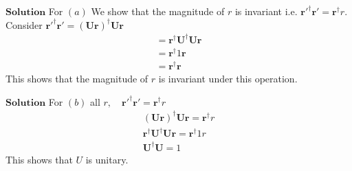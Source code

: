 \documentclass{article}
\begin{document}
\begin{flushleft}
$\boxed{\textbf{Solution}}$ For $(a)$ We show that the magnitude of $r$ is invariant i.e. $\mathbf{r}'^{\dagger} \mathbf{r}'=\mathbf{r}^{\dagger} r$. Consider $\mathbf{r}'^{\dagger} \mathbf{r}'=(\mathbf{U} \mathbf{r})^{\dagger} \mathbf{U} \mathbf{r}$
$$
\begin{array}{l}
=\mathbf{r}^{\dagger}  \mathbf{U}^{\dagger} \mathbf{U} \mathbf{r} \\
=\mathbf{r}^{\dagger} 1 \mathbf{r} \\
=\mathbf{r}^{\dagger} \mathbf{r}
\end{array}
$$
This shows that the magnitude of $r$ is invariant under this operation.




$\boxed{\textbf{Solution}}$ For $(b)$ all $r, \quad \mathbf{r}'^{\dagger} \mathbf{r}'=\mathbf{r}^{\dagger} r$
$$
\begin{array}{l}
(\mathbf{U} \mathbf{r})^{\dagger} \mathbf{U} \mathbf{r}=\mathbf{r}^{\dagger} r \\
\mathbf{r}^{\dagger}  \mathbf{U}^{\dagger} \mathbf{U} \mathbf{r}=\mathbf{r}^{\dagger} 1 r \\
 \mathbf{U}^{\dagger} \mathbf{U}=1
\end{array}
$$
This shows that $U$ is unitary.





\end{flushleft}
\end{document}
